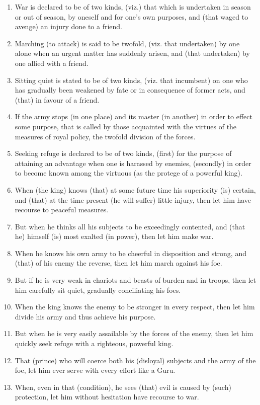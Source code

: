 \begin{enumerate}
\item War is declared to be of two kinds, (viz.) that which is undertaken in season or out of season, by oneself and for one's own purposes, and (that waged to avenge) an injury done to a friend.
\item Marching (to attack) is said to be twofold, (viz. that undertaken) by one alone when an urgent matter has suddenly arisen, and (that undertaken) by one allied with a friend.
\item Sitting quiet is stated to be of two kinds, (viz. that incumbent) on one who has gradually been weakened by fate or in consequence of former acts, and (that) in favour of a friend.
\item If the army stops (in one place) and its master (in another) in order to effect some purpose, that is called by those acquainted with the virtues of the measures of royal policy, the twofold division of the forces.
\item Seeking refuge is declared to be of two kinds, (first) for the purpose of attaining an advantage when one is harassed by enemies, (secondly) in order to become known among the virtuous (as the protege of a powerful king).
\item When (the king) knows (that) at some future time his superiority (is) certain, and (that) at the time present (he will suffer) little injury, then let him have recourse to peaceful measures.
\item But when he thinks all his subjects to be exceedingly contented, and (that he) himself (is) most exalted (in power), then let him make war.
\item When he knows his own army to be cheerful in disposition and strong, and (that) of his enemy the reverse, then let him march against his foe.
\item But if he is very weak in chariots and beasts of burden and in troops, then let him carefully sit quiet, gradually conciliating his foes.
\item When the king knows the enemy to be stronger in every respect, then let him divide his army and thus achieve his purpose.
\item But when he is very easily assailable by the forces of the enemy, then let him quickly seek refuge with a righteous, powerful king.
\item That (prince) who will coerce both his (disloyal) subjects and the army of the foe, let him ever serve with every effort like a Guru.
\item When, even in that (condition), he sees (that) evil is caused by (such) protection, let him without hesitation have recourse to war.

\end{enumerate}
